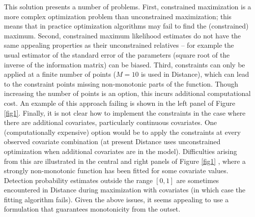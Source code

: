 \documentclass[useAMS,referee,usenatbib]{biom}
\begin{document}
This solution presents a number of problems. First, constrained maximization is a more complex optimization problem than unconstrained maximization; this means that in practice optimization algorithms may fail to find the (constrained) maximum.  Second, constrained maximum likelihood estimates do not have the same appealing properties as their unconstrained relatives -- for example the usual estimator of the standard error of the parameters (square root of the inverse of the information matrix) can be biased.  Third, constraints can only be applied at a finite number of points ($M=10$ is used in Distance), which can lead to the constraint points missing non-monotonic parts of the function. Though increasing the number of points is an option, this incurs additional computational cost. An example of this approach failing is shown in the left panel of Figure \ref{fig1}. Finally, it is not clear how to implement the constraints in the case where there are additional covariates, particularly continuous covariates. One (computationally expensive) option would be to apply the constraints at every observed covariate combination (at present Distance uses unconstrained optimization when additional covariates are in the model). Difficulties arising from this are illustrated in the central and right panels of Figure \ref{fig1} \citep[from][]{Pike:2003ug}, where a strongly non-monotonic function has been fitted for some covariate values. Detection probability estimates outside the range $[0,1]$ are sometimes encountered in Distance during maximization with covariates (in which case the fitting algorithm fails). Given the above issues, it seems appealing to use a formulation that guarantees monotonicity from the outset.
\end{document}
